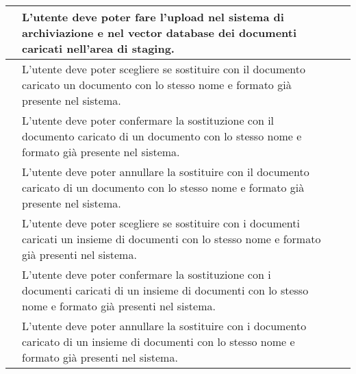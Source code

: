 \documentclass[10pt, a4paper]{article}
\begin{document}
\begin{xltabular}{\textwidth}{|c|X|c|c}
\hline {} & L'utente deve poter fare l'upload nel sistema di archiviazione e nel vector database dei documenti caricati nell'area di staging. &  \\
\hline {} & L'utente deve poter scegliere se sostituire con il documento caricato un documento con lo stesso nome e formato già presente nel sistema. &  \\
\hline {} & L'utente deve poter confermare la sostituzione con il documento caricato di un documento con lo stesso nome e formato già presente nel sistema. &  \\
\hline {} & L'utente deve poter annullare la sostituire con il documento caricato di un documento con lo stesso nome e formato già presente nel sistema. &  \\
\hline {} & L'utente deve poter scegliere se sostituire con i documenti caricati un insieme di documenti con lo stesso nome e formato già presenti nel sistema. &  \\
\hline {} & L'utente deve poter confermare la sostituzione con i documenti caricati di un insieme di documenti con lo stesso nome e formato già presenti nel sistema. &  \\
\hline {} & L'utente deve poter annullare la sostituire con i documento caricato di un insieme di documenti con lo stesso nome e formato già presenti nel sistema. &  \\


\end{xltabular}
\end{document}
